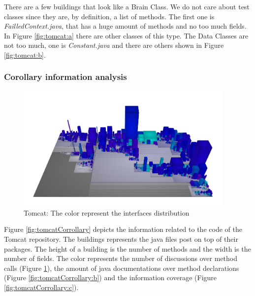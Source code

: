 \documentclass[]{usiinfbachelorproject}
\begin{document}
There are a few buildings that look like a Brain Class. We do not care about test classes since they are, by definition, a list of methods. The first one is  \textit{FailledContext.java}, that has a huge amount of methods and no too much fields. In Figure \ref{fig:tomcat:a} there are other classes of this type.
The Data Classes are not too much, one is \textit{Constant.java} and there are others shown in Figure \ref{fig:tomcat:b}.



\subsubsection{Corollary information analysis}





\begin{figure}[H]
	\centering
	\includegraphics[width=0.95\textwidth]{images/discussionTomcat}
	\caption[Tomcat: Discussions ]{Tomcat: The color represent the interfaces  distribution  \label{fig:tomcatCorrollary:a}}
\end{figure}





Figure \ref{fig:tomcatCorrollary} depicts the information related to the code of the Tomcat repository. The buildings represents the java files post on top of their packages. The height of a building is the number of methods and the width is the number of fields. The color represents the number of discussions over method calls (Figure \ref{fig:tomcatCorrollary:a}), the amount of java documentations over method declarations (Figure \ref{fig:tomcatCorrollary:b}) and the information coverage (Figure \ref{fig:tomcatCorrollary:c}).
\end{document}
